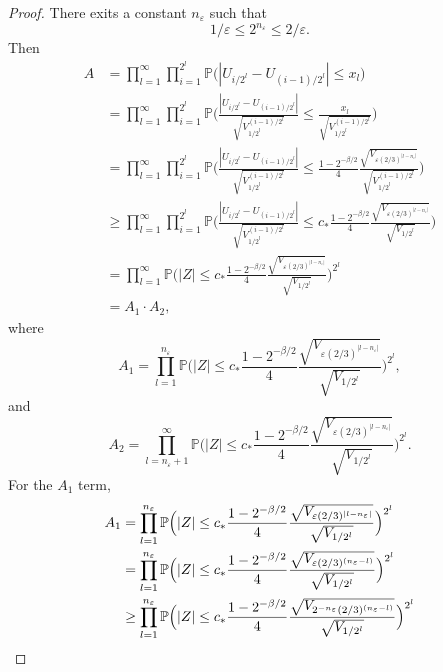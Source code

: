 \documentclass[preprint,12pt]{elsarticle}
\theoremstyle{definition}  %
\theoremstyle{plain}  %
\begin{document}
\begin{proof}
There exits a constant $n_\varepsilon$ such that 
\begin{equation*} 
1/\varepsilon\leq 2^{n_\varepsilon} \leq 2/\varepsilon. 
\end{equation*} 
Then 
\begin{align*} 
A &= \prod_{l=1}^\infty \prod_{i=1}^{2^l} \mathbb{P}\big(|U_{i/2^l}-U_{(i-1)/2^l}|\leq x_l\big)\\ 
&= \prod_{l=1}^\infty \prod_{i=1}^{2^l} \mathbb{P}\Big(\frac{|U_{i/2^l}-U_{(i-1)/2^l}|}{\sqrt{V_{1/2^l}^{(i-1)/2^l}}} \leq \frac{x_l}{\sqrt{V_{1/2^l}^{(i-1)/2^l}}} \Big)\\ 
&= \prod_{l=1}^\infty \prod_{i=1}^{2^l} \mathbb{P}\Big(\frac{|U_{i/2^l}-U_{(i-1)/2^l}|}{\sqrt{V_{1/2^l}^{(i-1)/2^l}}} \leq \frac{1-2^{-\beta/2}}{4} \frac{\sqrt{V_{\varepsilon (2/3)^{|l-n_\varepsilon|}}}}{\sqrt{V_{1/2^l}^{(i-1)/2^l}}} \Big)\\ 
&\geq \prod_{l=1}^\infty \prod_{i=1}^{2^l} \mathbb{P}\Big(\frac{|U_{i/2^l}-U_{(i-1)/2^l}|}{\sqrt{V_{1/2^l}^{(i-1)/2^l}}} \leq c_* \frac{1-2^{-\beta/2}}{4} \frac{\sqrt{V_{\varepsilon (2/3)^{|l-n_\varepsilon|}}}}{\sqrt{V_{1/2^l}}} \Big)\\ 
&= \prod_{l=1}^\infty \mathbb{P}\Big(|Z| \leq c_* \frac{1-2^{-\beta/2}}{4} \frac{\sqrt{V_{\varepsilon (2/3)^{|l-n_\varepsilon|}}}}{\sqrt{V_{1/2^l}}} \Big)^{2^l} \\ 
&= A_1 \cdot A_2, 
\end{align*} 
where 
\begin{equation*} 
A_1 = \prod_{l=1}^{n_\varepsilon} \mathbb{P}\Big(|Z|\leq c_* \frac{1-2^{-\beta/2}}{4} \frac{\sqrt{V_{\varepsilon(2/3)^{|l-n_\varepsilon|}}}}{\sqrt{V_{1/2^l}}} \Big)^{2^l},
\end{equation*} 
and 
\begin{equation*} 
A_2 = \prod_{l=n_\varepsilon+1}^\infty \mathbb{P}\Big(|Z|\leq c_* \frac{1-2^{-\beta/2}}{4} \frac{\sqrt{V_{\varepsilon(2/3)^{|l-n_\varepsilon|}}}}{\sqrt{V_{1/2^l}}} \Big)^{2^l}. 
\end{equation*} 
For the $A_1$ term,
\begin{align} 
A_1 &= \prod_{l=1}^{n_\varepsilon} \mathbb{P}\Big(|Z|\leq c_* \frac{1-2^{-\beta/2}}{4} \frac{\sqrt{V_{\varepsilon(2/3)^{|l-n_\varepsilon|}}}}{\sqrt{V_{1/2^l}}}\Big)^{2^l} \notag\\ 
&= \prod_{l=1}^{n_\varepsilon} \mathbb{P}\Big(|Z|\leq c_* \frac{1-2^{-\beta/2}}{4} \frac{\sqrt{V_{\varepsilon(2/3)^{(n_\varepsilon-l)}}}}{\sqrt{V_{1/2^l}}}\Big)^{2^l} \notag\\ 
&\geq \prod_{l=1}^{n_\varepsilon} \mathbb{P}\Big(|Z|\leq c_* \frac{1-2^{-\beta/2}}{4} \frac{\sqrt{V_{2^{-n_\varepsilon}(2/3)^{(n_\varepsilon-l)}}}}{\sqrt{V_{1/2^l}}}\Big)^{2^l} \notag\\ 

\end{align}
\end{proof}
\end{document}
